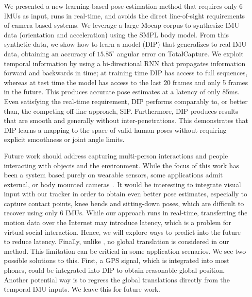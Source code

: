 \documentclass[acmtog]{acmart}
\begin{document}
We presented a new learning-based pose-estimation method that requires only 6 IMUs as input, runs in real-time, and avoids the direct line-of-sight requirements of camera-based systems. We leverage a large Mocap corpus to synthesize IMU data (orientation and acceleration) using the SMPL body model. From this synthetic data, we show how to learn a  model (DIP) that generalizes to real IMU data, obtaining an accuracy of $15.85^\circ$ angular error on TotalCapture. We exploit temporal information by using a bi-directional RNN that propagates information forward and backwards in time; at training time DIP has access to full sequences, whereas at test time the model has access to the last 20 frames and only 5 frames in the future. This produces accurate pose estimates at a latency of only 85ms. Even satisfying the real-time requirement, DIP performs comparably to, or better than, the competing off-line approach, SIP. Furthermore, DIP produces results that are smooth and generally without inter-penetrations. This demonstrates that DIP learns a mapping to the space of valid human poses without requiring explicit smoothness or joint angle limits. 

Future work should address capturing multi-person interactions and people interacting with objects and the environment. While the focus of this work has been a system based purely on wearable sensors, some applications admit external, or body mounted cameras~\cite{rhodin2016egocap}. It would be interesting to integrate visual input with our tracker in order to obtain even better pose estimates, especially to capture contact points, knee bends and sitting-down poses, which are difficult to recover using only 6 IMUs. While our approach runs in real-time, transferring the motion data over the Internet may introduce latency, which is a problem for virtual social interaction. Hence, we will explore ways to predict into the future to reduce latency. Finally, unlike \cite{von2017sparse}, no global translation is considered in our method. This limitation can be critical in some application scenarios. We see two possible solutions to this. First, a GPS signal, which is integrated into most phones, could be integrated into DIP to obtain reasonable global position. Another potential way is to regress the global translations directly from the temporal IMU inputs. We leave this for future work.
\end{document}
